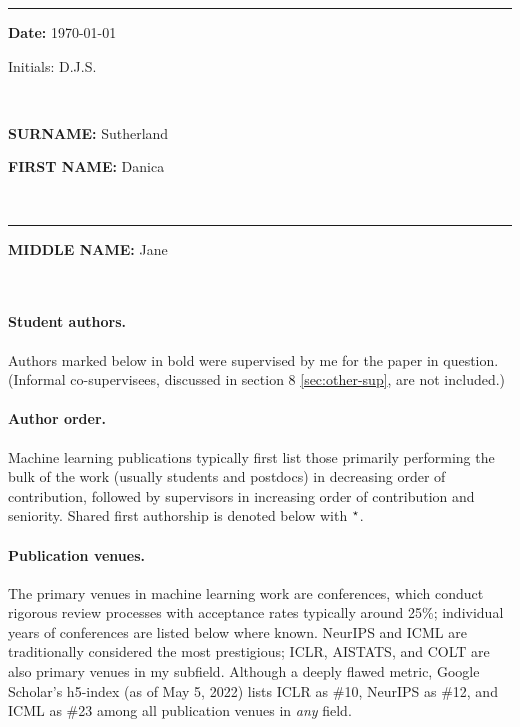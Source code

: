 \documentclass[10pt]{article}
\begin{document}


\newpage
{}\bigskip\rule{3.5in}{0mm}
\parbox[t]{2in}{{\bf Date:} \today}\parbox[t]{1in}{Initials: D.J.S.} \\
\noindent\parbox[t]{.5in}{\mbox{}}\parbox[t]{3.04in}{{\bf SURNAME:}
  Sutherland}\parbox[t]{3.2in}{{\bf FIRST NAME:} Danica}
\\\rule{3.54in}{0mm}\parbox[t]{3.2in}{{\bf MIDDLE NAME:} Jane}
\\[5mm]
\setcounter{section}{0}
\vspace{12pt}

\paragraph{Student authors.} Authors marked below in bold were supervised by me for the paper in question.
(Informal co-supervisees, discussed in section 8 \ref{sec:other-sup}, are not included.)

\paragraph{Author order.} Machine learning publications typically first list those primarily performing the bulk of the work (usually students and postdocs) in decreasing order of contribution,
followed by supervisors in increasing order of contribution and seniority.
Shared first authorship is denoted below with $^\star$.

\paragraph{Publication venues.} The primary venues in machine learning work are conferences,
which conduct rigorous review processes with acceptance rates typically around 25\%;
individual years of conferences are listed below where known.
NeurIPS and ICML are traditionally considered the most prestigious;
ICLR, AISTATS, and COLT are also primary venues in my subfield.
Although a deeply flawed metric, Google Scholar's h5-index (as of May 5, 2022) lists ICLR as \#10, NeurIPS as \#12, and ICML as \#23 among all publication venues in \emph{any} field.
\end{document}
